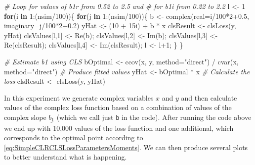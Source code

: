 \documentclass[
]{book}
\newenvironment{Shaded}{\begin{snugshade}}{\end{snugshade}}
\newcommand{\AttributeTok}[1]{\textcolor[rgb]{0.77,0.63,0.00}{#1}}
\newcommand{\CommentTok}[1]{\textcolor[rgb]{0.56,0.35,0.01}{\textit{#1}}}
\newcommand{\ControlFlowTok}[1]{\textcolor[rgb]{0.13,0.29,0.53}{\textbf{#1}}}
\newcommand{\DecValTok}[1]{\textcolor[rgb]{0.00,0.00,0.81}{#1}}
\newcommand{\FloatTok}[1]{\textcolor[rgb]{0.00,0.00,0.81}{#1}}
\newcommand{\FunctionTok}[1]{\textcolor[rgb]{0.00,0.00,0.00}{#1}}
\newcommand{\NormalTok}[1]{#1}
\newcommand{\OtherTok}[1]{\textcolor[rgb]{0.56,0.35,0.01}{#1}}
\newcommand{\SpecialCharTok}[1]{\textcolor[rgb]{0.00,0.00,0.00}{#1}}
\newcommand{\StringTok}[1]{\textcolor[rgb]{0.31,0.60,0.02}{#1}}
\begin{document}
\begin{Shaded}
\begin{Highlighting}[]
\CommentTok{\# Loop for values of b1r from 0.52 to 2.5 and}
\CommentTok{\# for b1i from 0.22 to 2.2}
\NormalTok{l }\OtherTok{\textless{}{-}} \DecValTok{1}
\ControlFlowTok{for}\NormalTok{(i }\ControlFlowTok{in} \DecValTok{1}\SpecialCharTok{:}\NormalTok{(nsim}\SpecialCharTok{/}\DecValTok{100}\NormalTok{))\{}
    \ControlFlowTok{for}\NormalTok{(j }\ControlFlowTok{in} \DecValTok{1}\SpecialCharTok{:}\NormalTok{(nsim}\SpecialCharTok{/}\DecValTok{100}\NormalTok{))\{}
\NormalTok{        b }\OtherTok{\textless{}{-}} \FunctionTok{complex}\NormalTok{(}\AttributeTok{real=}\NormalTok{i}\SpecialCharTok{/}\DecValTok{100}\SpecialCharTok{*}\DecValTok{2}\FloatTok{+0.5}\NormalTok{, }\AttributeTok{imaginary=}\NormalTok{j}\SpecialCharTok{/}\DecValTok{100}\SpecialCharTok{*}\DecValTok{2}\FloatTok{+0.2}\NormalTok{)}
\NormalTok{        yHat }\OtherTok{\textless{}{-}}\NormalTok{ (}\DecValTok{10} \SpecialCharTok{+}\NormalTok{ 15i) }\SpecialCharTok{+}\NormalTok{ b }\SpecialCharTok{*}\NormalTok{ x}
\NormalTok{        clsResult }\OtherTok{\textless{}{-}} \FunctionTok{clsLoss}\NormalTok{(y, yHat)}
\NormalTok{        clsValues[l,}\DecValTok{1}\NormalTok{] }\OtherTok{\textless{}{-}} \FunctionTok{Re}\NormalTok{(b);}
\NormalTok{        clsValues[l,}\DecValTok{2}\NormalTok{] }\OtherTok{\textless{}{-}} \FunctionTok{Im}\NormalTok{(b);}
\NormalTok{        clsValues[l,}\DecValTok{3}\NormalTok{] }\OtherTok{\textless{}{-}} \FunctionTok{Re}\NormalTok{(clsResult);}
\NormalTok{        clsValues[l,}\DecValTok{4}\NormalTok{] }\OtherTok{\textless{}{-}} \FunctionTok{Im}\NormalTok{(clsResult);}
\NormalTok{        l }\OtherTok{\textless{}{-}}\NormalTok{ l}\SpecialCharTok{+}\DecValTok{1}\NormalTok{;}
\NormalTok{    \}}
\NormalTok{\}}

\CommentTok{\# Estimate b1 using CLS}
\NormalTok{bOptimal }\OtherTok{\textless{}{-}} \FunctionTok{ccov}\NormalTok{(x, y, }\AttributeTok{method=}\StringTok{"direct"}\NormalTok{) }\SpecialCharTok{/}
            \FunctionTok{cvar}\NormalTok{(x, }\AttributeTok{method=}\StringTok{"direct"}\NormalTok{)}
\CommentTok{\# Produce fitted values}
\NormalTok{yHat }\OtherTok{\textless{}{-}}\NormalTok{ bOptimal }\SpecialCharTok{*}\NormalTok{ x}
\CommentTok{\# Calculate the loss}
\NormalTok{clsResult }\OtherTok{\textless{}{-}} \FunctionTok{clsLoss}\NormalTok{(y, yHat)}
\end{Highlighting}
\end{Shaded}

In this experiment we generate complex variables \(x\) and \(y\) and then calculate values of the complex loss function based on a combination of values of the complex slope \(\underline{b_1}\) (which we call just \texttt{b} in the code). After running the code above we end up with 10,000 values of the loss function and one additional, which corresponds to the optimal point according to \eqref{eq:SimpleCLRCLSLossParametersMoments}. We can then produce several plots to better understand what is happening.
\end{document}
